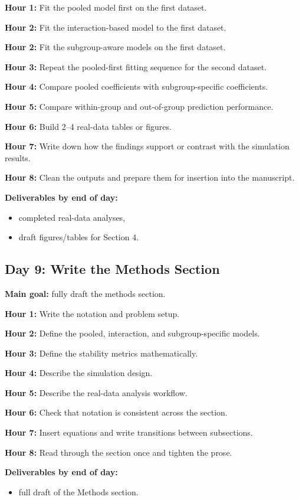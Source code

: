 \documentclass[11pt]{article}
\begin{document}
\textbf{Hour 1:} Fit the pooled model first on the first dataset.

\textbf{Hour 2:} Fit the interaction-based model to the first dataset.

\textbf{Hour 2:} Fit the subgroup-aware models on the first dataset.

\textbf{Hour 3:} Repeat the pooled-first fitting sequence for the second dataset.

\textbf{Hour 4:} Compare pooled coefficients with subgroup-specific coefficients.

\textbf{Hour 5:} Compare within-group and out-of-group prediction performance.

\textbf{Hour 6:} Build 2--4 real-data tables or figures.

\textbf{Hour 7:} Write down how the findings support or contrast with the simulation results.

\textbf{Hour 8:} Clean the outputs and prepare them for insertion into the manuscript.

\textbf{Deliverables by end of day:}
\begin{itemize}
    \item completed real-data analyses,
    \item draft figures/tables for Section 4.
\end{itemize}

\subsection*{Day 9: Write the Methods Section}
\textbf{Main goal:} fully draft the methods section.

\textbf{Hour 1:} Write the notation and problem setup.

\textbf{Hour 2:} Define the pooled, interaction, and subgroup-specific models.

\textbf{Hour 3:} Define the stability metrics mathematically.

\textbf{Hour 4:} Describe the simulation design.

\textbf{Hour 5:} Describe the real-data analysis workflow.

\textbf{Hour 6:} Check that notation is consistent across the section.

\textbf{Hour 7:} Insert equations and write transitions between subsections.

\textbf{Hour 8:} Read through the section once and tighten the prose.

\textbf{Deliverables by end of day:}
\begin{itemize}
    \item full draft of the Methods section.
\end{itemize}
\end{document}
